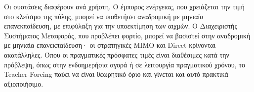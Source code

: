 Οι συστάσεις διαφέρουν ανά χρήστη. Ο έμπορος ενέργειας, που χρειάζεται την τιμή στο κλείσιμο
της πύλης, μπορεί να υιοθετήσει αναδρομική με μηνιαία επανεκπαίδευση, με επιφύλαξη για την
υποεκτίμηση των αιχμών. Ο Διαχειριστής Συστήματος Μεταφοράς, που προβλέπει φορτίο, μπορεί να
βασιστεί στην αναδρομική με μηνιαία επανεκπαίδευση· οι στρατηγικές MIMO και Direct κρίνονται
ακατάλληλες. Όπου οι πραγματικές
πρόσφατες τιμές είναι διαθέσιμες κατά την πρόβλεψη, όπως στην ενδοημερήσια αγορά ή σε
λειτουργία πραγματικού χρόνου, το Teacher-Forcing παύει να είναι θεωρητικό όριο και
γίνεται και αυτό πρακτικά αξιοποιήσιμο.
